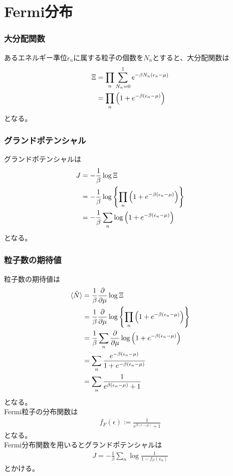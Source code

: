 \documentclass[dvipdfmx, 11pt, a4paper]{jsarticle}
\theoremstyle{definition}
\begin{document}
\section{Fermi分布}
\subsubsection{大分配関数}
    あるエネルギー準位$\epsilon_n$に属する粒子の個数を$N_n$とすると、大分配関数は
    \begin{align}
        \Xi &= \prod_n \sum_{N_n = 0}^{1} e^{-\beta N_n (\epsilon_n - \mu)} \notag \\
        &= \prod_n \left( 1 + e^{-\beta (\epsilon_n - \mu )} \right)
    \end{align}
    となる。
\subsubsection{グランドポテンシャル}
    グランドポテンシャルは
    \begin{align}
        J &= -\frac{1}{\beta} \log \Xi \notag \\
        &= -\frac{1}{\beta} \log \left\{ \prod_n \left( 1 + e^{-\beta (\epsilon_n - \mu )} \right) \right\} \notag \\
        &= -\frac{1}{\beta} \sum_n \log \left( 1 + e^{-\beta (\epsilon_n - \mu )} \right)
    \end{align}
    となる。
\subsubsection{粒子数の期待値}
    粒子数の期待値は
    \begin{align}
        \langle \hat{N} \rangle &= \frac{1}{\beta} \frac{\partial}{\partial \mu} \log \Xi \notag \\
        &= \frac{1}{\beta} \frac{\partial}{\partial \mu} \log \left\{ \prod_n \left( 1 + e^{-\beta (\epsilon_n - \mu )} \right) \right\} \notag \\
        &= \frac{1}{\beta} \sum_n \frac{\partial}{\partial \mu} \log \left( 1 + e^{-\beta (\epsilon_n - \mu )} \right) \notag \\
        &= \sum_n \frac{e^{-\beta (\epsilon_n - \mu )}}{1 + e^{-\beta (\epsilon_n - \mu )}} \notag \\
        &= \sum_n \frac{1}{e^{\beta (\epsilon_n - \mu)} + 1}
    \end{align}
    となる。\\
    Fermi粒子の分布関数は
    \begin{align}
        f_F (\epsilon) := \frac{1}{e^{\beta (\epsilon - \mu)} + 1}
    \end{align}
    となる。\\
    Fermi分布関数を用いるとグランドポテンシャルは
    \begin{align}
        J = -\frac{1}{\beta} \sum_n \log \frac{1}{1 - f_F (\epsilon_n)}
    \end{align}
    とかける。
\end{document}
